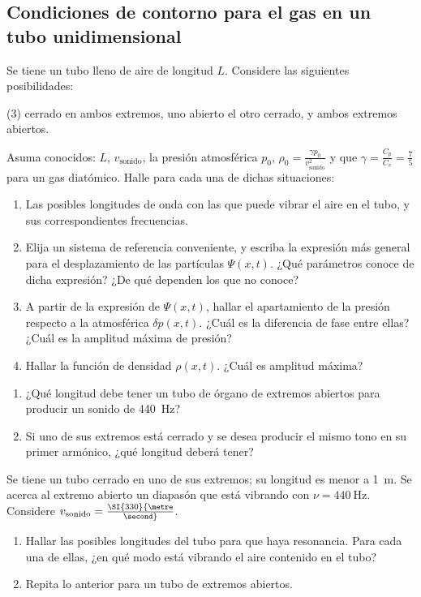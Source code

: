 \subsection*{Condiciones de contorno para el gas en un tubo unidimensional}

\item Se tiene un tubo lleno de aire de longitud $L$. Considere las siguientes posibilidades: 
\begin{tasks}(3)
	\task cerrado en ambos extremos,
	\task uno abierto el otro cerrado, y
	\task ambos extremos abiertos.
\end{tasks}
Asuma conocidos: $L$, $v_\text{sonido}$, la presión atmosférica $p_0$, $\rho_{0}= \frac{ \gamma p_0 }{ v_\text{sonido}^2}$ y que $\gamma= \frac{C_p}{C_v}= \frac{7}{5}$ para un gas diatómico.
Halle para cada una de dichas situaciones: 
\begin{enumerate}
	\item Las posibles longitudes de onda con las que puede vibrar el aire en el tubo, y sus correspondientes frecuencias. 
	\item Elija un sistema de referencia conveniente, y escriba la expresión más general para el desplazamiento de las partículas $\Psi(x,t)$.
	¿Qué parámetros conoce de dicha expresión?
	¿De qué dependen los que no conoce? 
	\item A partir de la expresión de $\Psi(x,t)$, hallar el apartamiento de la presión respecto a la atmosférica $\delta p(x,t)$.
	¿Cuál es la diferencia de fase entre ellas?
	¿Cuál es la amplitud máxima de presión? 
	\item Hallar la función de densidad $\rho(x,t)$.
	¿Cuál es amplitud máxima?
\end{enumerate}


\item 
\begin{enumerate}
\item ¿Qué longitud debe tener un tubo de órgano de extremos abiertos para producir un sonido de \SI{440}{\hertz}? 
\item Si uno de sus extremos está cerrado y se desea producir el mismo tono en su primer armónico, ¿qué longitud deberá tener?
\end{enumerate}


\item Se tiene un tubo cerrado en uno de sus extremos; su longitud es menor a \SI{1}{\metre}.
Se acerca al extremo abierto un diapasón que está vibrando con $\nu = \SI{440}{\hertz}$.
Considere $v_\text{sonido} = \SI{330}{\metre\over\second}$.
\begin{enumerate}
	\item Hallar las posibles longitudes del tubo para que haya resonancia.
	Para cada una de ellas, ¿en qué modo está vibrando el aire contenido en el tubo? 
	\item Repita lo anterior para un tubo de extremos abiertos.
\end{enumerate}


